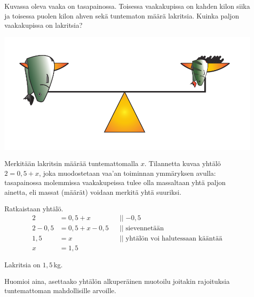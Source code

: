 \begin{esimerkki}
Kuvassa oleva vaaka on tasapainossa. Toisessa vaakakupissa on kahden kilon siika ja toisessa puolen kilon ahven sekä tuntematon määrä lakritsia. Kuinka paljon vaakakupissa on lakritsia?
	\begin{center}
		\includegraphics[scale=0.6]{pictures/Kuva10-1-vaaka.pdf} %
	\end{center}
	\begin{esimratk}
Merkitään lakritsin määrää tuntemattomalla $x$. Tilannetta kuvaa yhtälö $2 = 0,5 + x$, joka muodostetaan vaa'an toiminnan ymmäryksen avulla: tasapainossa molemmissa vaakakupeissa tulee olla massaltaan yhtä paljon ainetta, eli massat (määrät) voidaan merkitä yhtä suuriksi.

Ratkaistaan yhtälö.
		\begin{align*}
			2 &= 0,5 + x &&\text{|| $-0,5$} \\
			2-0,5 &= 0,5 + x -0,5 &&\text{|| sievennetään} \\
			1,5 &= x && \text{|| yhtälön voi halutessaan kääntää}\\
			x &= 1,5 &&
		\end{align*}
	\end{esimratk}
	\begin{esimvast}
		Lakritsia on $1,5$\,kg.
	\end{esimvast}
\end{esimerkki}

Huomioi aina, asettaako yhtälön alkuperäinen muotoilu joitakin rajoituksia tuntemattoman mahdollisille arvoille.

